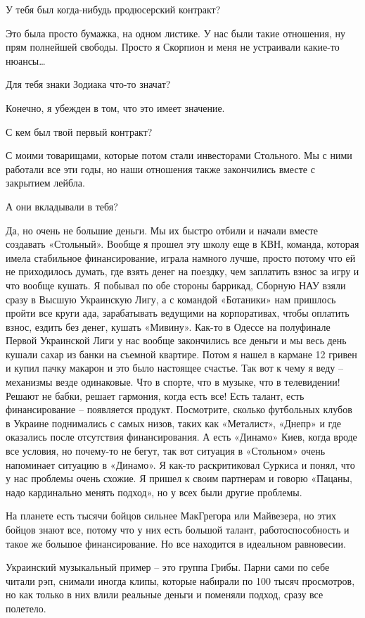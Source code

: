 У тебя был когда-нибудь продюсерский контракт?

Это была просто бумажка, на одном листике. У нас были такие отношения, ну прям
полнейшей свободы. Просто я Скорпион и меня не устраивали какие-то нюансы…

Для тебя знаки Зодиака что-то значат?

Конечно, я убежден в том, что это имеет значение.

С кем был твой первый контракт?

С моими товарищами, которые потом стали инвесторами Стольного. Мы с ними
работали все эти годы, но наши отношения также закончились вместе с закрытием
лейбла.

А они вкладывали в тебя?

Да, но очень не большие деньги. Мы их быстро отбили и начали вместе создавать
«Стольный». Вообще я прошел эту школу еще в КВН, команда, которая имела
стабильное финансирование, играла намного лучше, просто потому что ей не
приходилось думать, где взять денег на поездку, чем заплатить взнос за игру и
что вообще кушать. Я побывал по обе стороны баррикад, Сборную НАУ взяли сразу в
Высшую Украинскую Лигу, а с командой «Ботаники» нам пришлось пройти все круги
ада, зарабатывать ведущими на корпоративах, чтобы оплатить взнос, ездить без
денег, кушать «Мивину». Как-то в Одессе на полуфинале Первой Украинской Лиги у
нас вообще закончились все деньги и мы весь день кушали сахар из банки на
съемной квартире. Потом я нашел в кармане 12 гривен и купил пачку макарон и это
было настоящее счастье.  Так вот к чему я веду – механизмы везде одинаковые.
Что в спорте, что в музыке, что в телевидении! Решают не бабки, решает
гармония, когда есть все! Есть талант, есть финансирование – появляется
продукт. Посмотрите, сколько футбольных клубов в Украине поднимались с самых
низов, таких как «Металист», «Днепр» и где оказались после отсутствия
финансирования. А есть «Динамо» Киев, когда вроде все условия, но почему-то не
бегут, так вот ситуация в «Стольном» очень напоминает ситуацию в «Динамо». Я
как-то раскритиковал Суркиса и понял, что у нас проблемы очень схожие. Я пришел
к своим партнерам и говорю «Пацаны, надо кардинально менять подход», но у всех
были другие проблемы.

На планете есть тысячи бойцов сильнее МакГрегора или Майвезера, но этих бойцов
знают все, потому что у них есть большой талант, работоспособность и такое же
большое финансирование. Но все находится в идеальном равновесии.

Украинский музыкальный пример – это группа Грибы. Парни сами по себе читали
рэп, снимали иногда клипы, которые набирали по 100 тысяч просмотров, но как
только в них влили реальные деньги и поменяли подход, сразу все полетело.

